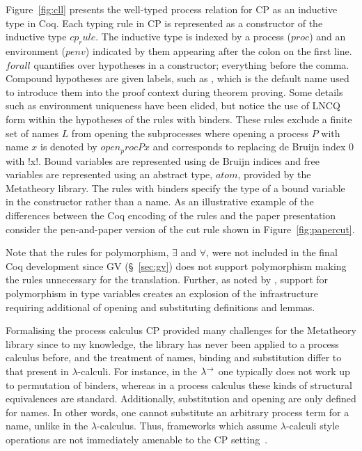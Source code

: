 Figure~\ref{fig:cll} presents the well-typed process relation for CP as an
inductive type in Coq. Each typing rule in CP is represented as a constructor
of the inductive type \coqe$cp_rule$. The inductive type is indexed by a
process (\coqe$proc$) and an environment (\coqe$penv$) indicated by them
appearing after the colon on the first line. \coqe$forall$ quantifies over
hypotheses in a constructor; everything before the comma. Compound hypotheses
are given labels, such as , which is the default name used to
introduce them into the proof context during theorem proving. Some details
such as environment uniqueness have been elided, but notice the use of LNCQ
form within the hypotheses of the rules with binders. These rules exclude a
finite set of names \coqe$L$ from opening the subprocesses where opening a
process \coqe$P$ with name \coqe$x$ is denoted by \coqe$open_proc P x$ and
corresponds to replacing de Bruijn index 0 with \coqe!x!. Bound variables are
represented using de Bruijn indices and free variables are represented using
an abstract type, \coqe$atom$, provided by the Metatheory library. The rules
with binders specify the type of a bound variable in the constructor rather
than a name. As an illustrative example of the differences between the Coq
encoding of the rules and the paper presentation consider the pen-and-paper
version of the cut rule shown in Figure~\ref{fig:papercut}.

Note that the rules for polymorphism, $\exists$ and $\forall$, were not
included in the final Coq development since GV (\S~\ref{sec:gv}) does not
support polymorphism making the rules unnecessary for the
translation. Further, as noted by \citeauthor{Lee:2012}, support for
polymorphism in type variables creates an explosion of the infrastructure
requiring additional of opening and substituting definitions and lemmas.

Formalising the process calculus CP provided many challenges for the
Metatheory library since to my knowledge, the library has never been applied
to a process calculus before, and the treatment of names, binding and
substitution differ to that present in $\lambda$-calculi. For instance, in the
$\lambda^\rightarrow$ one typically does not work up to permutation of binders, whereas in a
process calculus these kinds of structural equivalences are
standard. Additionally, substitution and opening are only defined for
names. In other words, one cannot substitute an arbitrary process term for a
name, unlike in the $\lambda$-calculus. Thus, frameworks which assume
$\lambda$-calculi style operations are not immediately amenable to the CP
setting~\cite{Lee:2012}.

